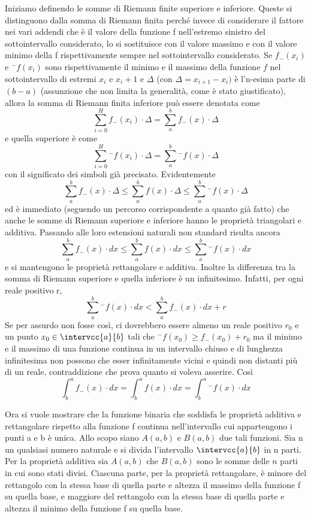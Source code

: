 Iniziamo definendo le somme di Riemann finite superiore e inferiore. Queste 
si distinguono dalla somma di Riemann finita perché invece di considerare il 
fattore nei vari addendi che è il valore della funzione f nell'estremo 
sinistro del sottointervallo considerato, lo si sostituisce con il valore 
massimo e con il valore minimo della f rispettivamente sempre nel 
sottointervallo considerato. Se \(f_{-}(x_i)\) e \({}^{-}f(x_i)\) sono 
rispettivamente il minimo e il massimo della funzione \(f\) nel 
sottointervallo 
di estremi \(x_i\) e \(x_i+1\) 
e \(\Delta\) (con \(\Delta =x_{i+1} - x_i)\) 
è l'n-esima parte di \((b - a)\) 
(assunzione che non limita la generalità, come è stato giustificato), 
allora la somma di Riemann finita inferiore può essere denotata come 
\[\sum_{i=0}^H f_{-}(x_i)\cdot\Delta = \sum_a^b f_{-}(x) \cdot \Delta\] 
e quella superiore è come 
\[\sum_{i=0}^H {}^{-}f(x_i)\cdot\Delta = 
  \sum_a^b {}^{-}f(x) \cdot \Delta\] 
con il significato dei simboli già precisato.
Evidentemente 
\[\sum_a^b f_{-}(x) \cdot \Delta \le \sum_a^b f(x) \cdot \Delta \le 
\sum_a^b {}^{-}f(x) \cdot \Delta\] 
ed è immediato (seguendo un percorso corrispondente a quanto già fatto) che 
anche le somme di Riemann superiore e inferiore hanno le proprietà triangolari 
e additiva. 
  Passando alle loro estensioni naturali non standard risulta ancora 
\[\sum_a^b f_{-}(x) \cdot dx \le \sum_a^b f(x) \cdot dx \le 
  \sum_a^b {}^{-}f(x) \cdot dx\] 
e si mantengono le proprietà rettangolare e additiva. 
Inoltre la differenza tra la somma di Riemann superiore e quella inferiore è 
un infinitesimo. Infatti, per ogni reale positivo r, 
\[\sum_a^b {}^{-}f(x) \cdot dx < \sum_a^b f_{-}(x) \cdot dx +r\] 
Se per assurdo non fosse così, ci dovrebbero essere almeno un reale 
positivo \(r_0\) e un punto \(x_0 \in \intervcc{a}{b}\) tali che 
\({}^{-}f(x_0) \ge f_{-}(x_0)+r_0\) 
ma il minimo e il massimo di una funzione continua in un intervallo chiuso e 
di lunghezza infinitesima non possono che esser infinitamente vicini e quindi 
non distanti più di un reale, contraddizione che prova quanto si voleva 
asserire. Così 
\[\int_b^a f_{-}(x) \cdot dx = \int_b^a f(x) \cdot dx = 
  \int_b^a {}^{-}f(x) \cdot dx\]
  
Ora si vuole mostrare che la funzione binaria che soddisfa le proprietà 
additiva e rettangolare rispetto alla funzione f continua nell'intervallo 
cui appartengono i punti a e b è unica.
Allo scopo siano \(A(a,b)\) e \(B(a,b)\) due tali funzioni. 
Sia n un qualsiasi numero naturale e si divida l'intervallo 
\(\intervcc{a}{b}\) in n parti. 
Per la proprietà 
additiva sia \(A(a,b)\) che \(B(a,b)\) sono le somme delle \(n\) 
parti in cui sono stati divisi. 
Ciascuna parte, per la proprietà rettangolare, è minore del 
rettangolo con la stessa base di quella parte e altezza il massimo della 
funzione f su quella base, e maggiore del rettangolo con la stessa base di 
quella parte e altezza il minimo della funzione f su quella base. 

